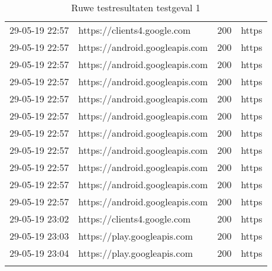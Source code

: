\begin{longtable}[c]{@{}llll@{}}
    29-05-19 22:57 & https://clients4.google.com & 200 & https \\
    29-05-19 22:57 & https://android.googleapis.com & 200 & https \\
    29-05-19 22:57 & https://android.googleapis.com & 200 & https \\
    29-05-19 22:57 & https://android.googleapis.com & 200 & https \\
    29-05-19 22:57 & https://android.googleapis.com & 200 & https \\
    29-05-19 22:57 & https://android.googleapis.com & 200 & https \\
    29-05-19 22:57 & https://android.googleapis.com & 200 & https \\
    29-05-19 22:57 & https://android.googleapis.com & 200 & https \\
    29-05-19 22:57 & https://android.googleapis.com & 200 & https \\
    29-05-19 22:57 & https://android.googleapis.com & 200 & https \\
    29-05-19 22:57 & https://android.googleapis.com & 200 & https \\
    29-05-19 23:02 & https://clients4.google.com & 200 & https \\
    29-05-19 23:03 & https://play.googleapis.com & 200 & https \\
    29-05-19 23:04 & https://play.googleapis.com & 200 & https \\* \bottomrule
    \caption{Ruwe testresultaten testgeval 1}
    \label{tab:rawresults-1}\\
\end{longtable}